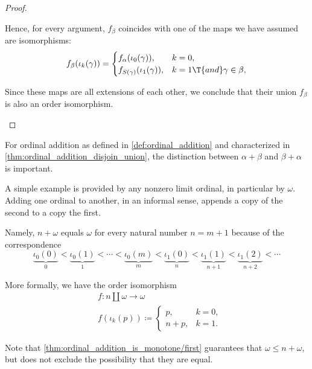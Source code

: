 \begin{proof}
\begin{itemize}
    Hence, for every argument, \( f_\beta \) coincides with one of the maps we have assumed are isomorphisms:
    \begin{equation*}
      f_\beta(\iota_k(\gamma)) = \begin{cases}
        f_\alpha(\iota_0(\gamma)),      &k = 0, \\
        f_{S(\gamma)}(\iota_1(\gamma)), &k = 1 \T{and} \gamma \in \beta,
      \end{cases}
    \end{equation*}

    Since these maps are all extensions of each other, we conclude that their union \( f_\beta \) is also an order isomorphism.
  \end{itemize}
\end{proof}

\begin{example}\label{ex:ordinal_addition_commutativity}
  For ordinal addition as defined in \cref{def:ordinal_addition} and characterized in \cref{thm:ordinal_addition_disjoin_union}, the distinction between \( \alpha + \beta \) and \( \beta + \alpha \) is important.

  A simple example is provided by any nonzero limit ordinal, in particular by \( \omega \). Adding one ordinal to another, in an informal sense, appends a copy of the second to a copy the first.

  Namely, \( n + \omega \) equals \( \omega \) for every natural number \( n = m + 1 \) because of the correspondence
  \begin{equation*}
    \underbrace{\iota_0(0)}_0 < \underbrace{\iota_0(1)}_1 < \cdots < \underbrace{\iota_0(m)}_m < \underbrace{\iota_1(0)}_n < \underbrace{\iota_1(1)}_{n + 1} < \underbrace{\iota_1(2)}_{n + 2} < \cdots
  \end{equation*}

  More formally, we have the order isomorphism
  \begin{equation*}
    \begin{aligned}
      &f: n \amalg \omega \to \omega \\
      &f(\iota_k(p)) \coloneqq \begin{cases}
        p,     &k = 0, \\
        n + p, &k = 1.
      \end{cases}
    \end{aligned}
  \end{equation*}

  Note that \cref{thm:ordinal_addition_is_monotone/first} guarantees that \( \omega \leq n + \omega \), but does not exclude the possibility that they are equal.


\end{example}
